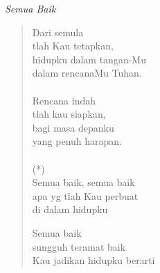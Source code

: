 \begin{center}
\itshape{Semua Baik}
\end{center}


\small
\begin{verse}
\itshape{
Dari semula\\
tlah Kau tetapkan,\\
hidupku dalam tangan-Mu\\
dalam rencanaMu Tuhan.\\
{~}\\
Rencana indah\\
tlah kau siapkan,\\
bagi masa depanku\\
yang penuh harapan.\\
{~}\\
(*)\\
Semua baik, semua baik\\
apa yg tlah Kau perbuat\\
di dalam hidupku\

Semua baik\\
sungguh teramat baik\\
Kau jadikan hidupku berarti
}
\end{verse}
\normalsize